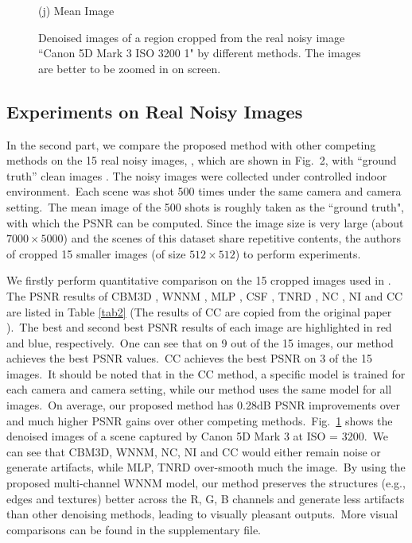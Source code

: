 \documentclass[10pt,twocolumn,letterpaper]{article}
\begin{document}
\begin{figure}
{\begin{minipage}[t]{0.195\textwidth}
{\footnotesize (j) Mean Image \cite{crosschannel2016}}
\end{minipage}
}\vspace{-0.5mm}
\caption{Denoised images of a region cropped from the real noisy image ``Canon 5D Mark 3 ISO 3200 1" \cite{crosschannel2016} by different methods. The images are better to be zoomed in on screen.}
\label{fig7}
\vspace{0.5mm}
\end{figure}

\subsection{Experiments on Real Noisy Images}
In the second part, we compare the proposed method with other competing methods on the 15 real noisy images, , which are shown in Fig.\ 2, with ``ground truth'' clean images \cite{crosschannel2016}. The noisy images were collected under controlled indoor environment.\ Each scene was shot 500 times under the same camera and camera setting.\ The mean image of the 500 shots is roughly taken as the ``ground truth", with which the PSNR can be computed. Since the image size is very large (about $7000\times5000$) and the scenes of this dataset share repetitive contents, the authors of \cite{crosschannel2016} cropped 15 smaller images (of size $512\times512$) to perform experiments.

We firstly perform quantitative comparison on the 15 cropped images used in \cite{crosschannel2016}. The PSNR results of CBM3D \cite{bm3d}, WNNM \cite{wnnm}, MLP \cite{mlp}, CSF \cite{csf}, TNRD \cite{chen2015learning}, NC \cite{noiseclinic,ncwebsite}, NI \cite{neatimage} and
CC \cite{crosschannel2016} are listed in Table \ref{tab2} (The results of CC are copied from the original paper \cite{crosschannel2016}).\ The best and second best PSNR results of each image are highlighted in red and blue, respectively.\ One can see that on 9 out of the 15 images, our method achieves the best PSNR values.\ CC achieves the best PSNR on 3 of the 15 images.\ It should be noted that in the CC method, a specific model is trained for each camera and camera setting, while our method uses the same model for all images.\ On average, our proposed method has 0.28dB PSNR improvements over \cite{crosschannel2016} and much higher PSNR gains over other competing methods.\ Fig.\ \ref{fig7} shows the denoised images of a scene captured by Canon 5D Mark 3 at ISO = 3200.\ We can see that CBM3D, WNNM, NC, NI and CC would either remain noise or generate artifacts, while MLP, TNRD over-smooth much the image.\ By using the proposed multi-channel WNNM model, our method preserves the structures (e.g., edges and textures) better across the R, G, B channels and generate less artifacts than other denoising methods, leading to visually pleasant outputs.\ More visual comparisons can be found in the supplementary file.
\end{document}
